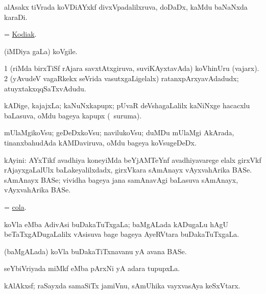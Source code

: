 \bentry
{}
\gl{\nA}
\bmng
alAsakx tiVrada koVDiAYxkf divxVpadalilxruva, doDaDx, kaMdu baNaNxda karaDi. 
\emng
\eentry

\bentry
{}
\gl{\nA}
\bmng
 = \hyperlink{Kodiak}{Kodiak}. 
\emng
\eentry

\bentry
{}
\gl{\nA}
\bmng
(iMDiya \AseTxrXV gaLa) koVgile. 
\emng
\eentry

\bentry
{}
\gl{\nA}
\bmng
\bnum
\num{1} (riMda birxTiSf rAjara savxtAtxgiruva, suviKAyxtavAda) koVhinUru (vajarx). 
\num{2} (yAvudeV vagaRkekx seVrida vasutxgaLigelalx) ratanxpArxyavAdadudx; atuyxtakxqqSaTxvAdudu. 
\enum
\emng
\eentry

\bentry
{}
\gl{\nA}
\bmng
kADige, kajajxLa; kaNuNxkapupx; pUvaR deVshagaLalilx kaNiNxge hacacxlu baLasuva, oMdu bageya kapupx (\sA\ suruma). 
\emng
\eentry

\bentry
{}
\gl{\nA}
\bmng
mUlaMgikoVsu; geDeDxkoVsu; navilukoVsu; duMDu mUlaMgi AkArada, tinanxbahudAda kAMDaviruva, oMdu bageya koVsugeDeDx.   
\emng
\eentry

\bentry
{}
\gl{\nA}
\bmng
kAyini: 
\banum
{} AYxTikf avadhiya koneyiMda beYjAMTeYnf avadhiyavarege elalx girxVkf rAjayxgaLalUlx baLakeyalilxdadx, girxVkara sAmAnayx vAyxvahArika BASe. 
 sAmAnayx BASe; vividha bageya jana samAnavAgi baLasuva sAmAnayx, vAyxvahArika BASe. 
\eanum
\emng
\eentry

\bentry
{}
\gl{\nA}
\bmng
= \hyperref{kandict_c.pdf}{C}{cola}{cola}. 
\emng
\eentry

\bentry
{}
\gl{\gu}
\bmng
koVla eMba AdivAsi buDakaTuTxgaLa; baMgALada kADugaLu hAgU beTaTxgADugaLalilx vAsisuva bage bageya AyeRVtara buDakaTuTxgaLa. 
\emng
\eentry

\bentry
{}
\gl{\nA}
\bmng
(baMgALada) koVla buDakaTiTxnavanu yA avana BASe. 
\emng
\eentry

\bentry
{}
\gl{\nA}
\bmng
seYbiVriyada miMkf eMba pArxNi yA adara tupupxLa. 
\emng
\eentry

\bentry
{}
\gl{\nA}
\bmng
kAlAkxsf; raSayxda samaSiTx jamiVnu, sAmUhika vayxvasAya keSxVtarx. 
\emng
\eentry

